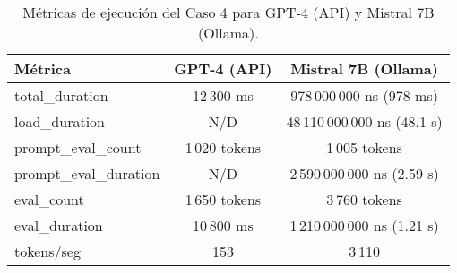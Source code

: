 
\begin{table}[h!]
\centering
\begin{tabular}{|l|c|c|}
\hline
\textbf{Métrica} & \textbf{GPT-4 (API)} & \textbf{Mistral 7B (Ollama)} \\
\hline
total\_duration & 12\,300 ms & 978\,000\,000 ns (978 ms) \\
load\_duration & N/D & 48\,110\,000\,000 ns (48.1 s) \\
prompt\_eval\_count & 1\,020 tokens & 1\,005 tokens \\
prompt\_eval\_duration & N/D & 2\,590\,000\,000 ns (2.59 s) \\
eval\_count & 1\,650 tokens & 3\,760 tokens \\
eval\_duration & 10\,800 ms & 1\,210\,000\,000 ns (1.21 s) \\
tokens/seg & 153 & 3\,110 \\
\hline
\end{tabular}
\caption{Métricas de ejecución del Caso 4 para GPT-4 (API) y Mistral 7B (Ollama).}
\end{table}
